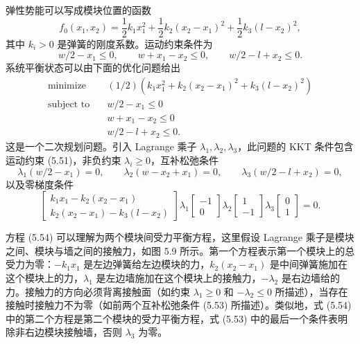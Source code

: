 \documentclass[UTF8,12pt,a4paper,fontset=fandol]{ctexart}
\begin{document}
弹性势能可以写成模块位置的函数
\[
f_0(x_1,x_2)=\frac{1}{2}k_1x_1^2+\frac{1}{2}k_2(x_2-x_1)^2+\frac{1}{2}k_3(l-x_2)^2,
\]
其中 $k_i>0$ 是弹簧的刚度系数。运动约束条件为
\begin{equation}
w/2-x_1\leq 0,\qquad w+x_1-x_2\leq 0,\qquad w/2-l+x_2\leq 0.
\tag{5.51}
\end{equation}
系统平衡状态可以由下面的优化问题给出
\begin{equation}
\begin{aligned}
\text{minimize}\quad & (1/2)(k_1x_1^2+k_2(x_2-x_1)^2+k_3(l-x_2)^2)\\
\text{subject to}\quad & w/2-x_1\leq 0\\
& w+x_1-x_2\leq 0\\
& w/2-l+x_2\leq 0.
\end{aligned}
\tag{5.52}
\end{equation}
这是一个二次规划问题。引入 Lagrange 乘子 $\lambda_1,\lambda_2,\lambda_3$，此问题的 KKT 条件包含运动约束 (5.51)，非负约束 $\lambda_i\geq 0$，互补松弛条件
\begin{equation}
\lambda_1(w/2-x_1)=0,\qquad
\lambda_2(w-x_2+x_1)=0,\qquad
\lambda_3(w/2-l+x_2)=0,
\tag{5.53}
\end{equation}
以及零梯度条件
\begin{equation}
\begin{bmatrix}
k_1x_1-k_2(x_2-x_1)\\
k_2(x_2-x_1)-k_3(l-x_2)
\end{bmatrix}
\lambda_1\begin{bmatrix}-1\\0\end{bmatrix}
\lambda_2\begin{bmatrix}1\\-1\end{bmatrix}
\lambda_3\begin{bmatrix}0\\1\end{bmatrix}
=0.
\tag{5.54}
\end{equation}

方程 (5.54) 可以理解为两个模块间受力平衡方程，这里假设 Lagrange 乘子是模块之间、模块与墙之间的接触力，如图 5.9 所示。第一个方程表示第一个模块上的总受力为零：$-k_1x_1$ 是左边弹簧给左边模块的力，$k_2(x_2-x_1)$ 是中间弹簧施加在这个模块上的力，$\lambda_1$ 是左边墙施加在这个模块上的接触力，$-\lambda_2$ 是右边墙给的力。接触力的方向必须背离接触面（如约束 $\lambda_1\geq 0$ 和 $-\lambda_2\leq 0$ 所描述），当存在接触时接触力不为零（如前两个互补松弛条件 (5.53) 所描述）。类似地，式 (5.54) 中的第二个方程是第二个模块的受力平衡方程，式 (5.53) 中的最后一个条件表明除非右边模块接触墙，否则 $\lambda_3$ 为零。
\end{document}
